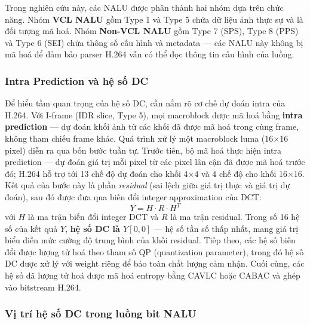 Trong nghiên cứu này, các NALU được phân thành hai nhóm dựa trên chức năng. Nhóm \textbf{VCL NALU} gồm Type 1 và Type 5 chứa dữ liệu ảnh thực sự và là đối tượng mã hoá. Nhóm \textbf{Non-VCL NALU} gồm Type 7 (SPS), Type 8 (PPS) và Type 6 (SEI) chứa thông số cấu hình và metadata --- các NALU này không bị mã hoá để đảm bảo parser H.264 vẫn có thể đọc thông tin cấu hình của luồng.

\subsubsection{Intra Prediction và hệ số DC}

Để hiểu tầm quan trọng của hệ số DC, cần nắm rõ cơ chế dự đoán intra của H.264. Với I-frame (IDR slice, Type 5), mọi macroblock được mã hoá bằng \textbf{intra prediction} --- dự đoán khối ảnh từ các khối đã được mã hoá trong cùng frame, không tham chiếu frame khác. Quá trình xử lý một macroblock luma (16$\times$16 pixel) diễn ra qua bốn bước tuần tự. Trước tiên, bộ mã hoá thực hiện intra prediction --- dự đoán giá trị mỗi pixel từ các pixel lân cận đã được mã hoá trước đó; H.264 hỗ trợ tới 13 chế độ dự đoán cho khối 4$\times$4 và 4 chế độ cho khối 16$\times$16. Kết quả của bước này là phần \emph{residual} (sai lệch giữa giá trị thực và giá trị dự đoán), sau đó được đưa qua biến đổi integer approximation của DCT:
\begin{equation}
Y = H \cdot R \cdot H^T
\end{equation}
với $H$ là ma trận biến đổi integer DCT và $R$ là ma trận residual. Trong số 16 hệ số của kết quả $Y$, \textbf{hệ số DC là $Y[0,0]$} --- hệ số tần số thấp nhất, mang giá trị biểu diễn mức cường độ trung bình của khối residual. Tiếp theo, các hệ số biến đổi được lượng tử hoá theo tham số QP (quantization parameter), trong đó hệ số DC được xử lý với weight riêng để bảo toàn chất lượng cảm nhận. Cuối cùng, các hệ số đã lượng tử hoá được mã hoá entropy bằng CAVLC hoặc CABAC và ghép vào bitstream H.264.

\subsubsection{Vị trí hệ số DC trong luồng bit NALU}


